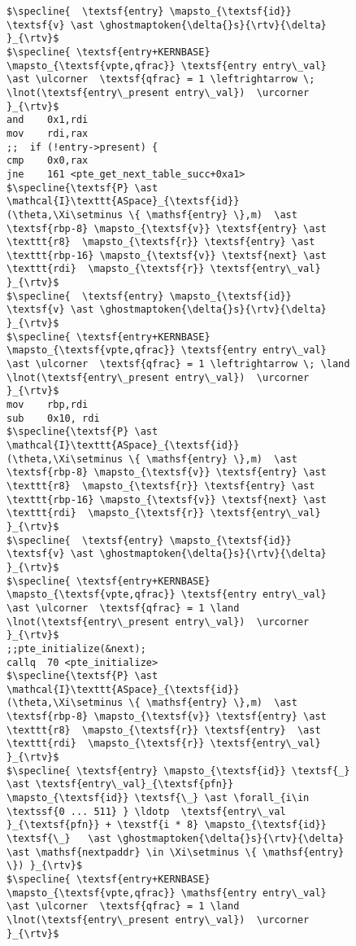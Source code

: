 \begin{figure}
\begin{lstlisting}[mathescape]
$\specline{  \textsf{entry} \mapsto_{\textsf{id}} \textsf{v} \ast \ghostmaptoken{\delta{}s}{\rtv}{\delta}  }_{\rtv}$
$\specline{ \textsf{entry+KERNBASE} \mapsto_{\textsf{vpte,qfrac}} \textsf{entry entry\_val} \ast \ulcorner  \textsf{qfrac} = 1 \leftrightarrow \; \lnot(\textsf{entry\_present entry\_val})  \urcorner }_{\rtv}$
and    0x1,rdi
mov    rdi,rax
;;  if (!entry->present) {
cmp    0x0,rax
jne    161 <pte_get_next_table_succ+0xa1>
$\specline{\textsf{P} \ast \mathcal{I}\texttt{ASpace}_{\textsf{id}}(\theta,\Xi\setminus \{ \mathsf{entry} \},m)  \ast \textsf{rbp-8} \mapsto_{\textsf{v}} \textsf{entry} \ast \texttt{r8}  \mapsto_{\textsf{r}} \textsf{entry} \ast \texttt{rbp-16} \mapsto_{\textsf{v}} \textsf{next} \ast \texttt{rdi}  \mapsto_{\textsf{r}} \textsf{entry\_val} }_{\rtv}$
$\specline{  \textsf{entry} \mapsto_{\textsf{id}} \textsf{v} \ast \ghostmaptoken{\delta{}s}{\rtv}{\delta}  }_{\rtv}$
$\specline{ \textsf{entry+KERNBASE} \mapsto_{\textsf{vpte,qfrac}} \textsf{entry entry\_val} \ast \ulcorner  \textsf{qfrac} = 1 \leftrightarrow \; \land \lnot(\textsf{entry\_present entry\_val})  \urcorner }_{\rtv}$
mov    rbp,rdi
sub    0x10, rdi
$\specline{\textsf{P} \ast \mathcal{I}\texttt{ASpace}_{\textsf{id}}(\theta,\Xi\setminus \{ \mathsf{entry} \},m)  \ast \textsf{rbp-8} \mapsto_{\textsf{v}} \textsf{entry} \ast \texttt{r8}  \mapsto_{\textsf{r}} \textsf{entry} \ast \texttt{rbp-16} \mapsto_{\textsf{v}} \textsf{next} \ast \texttt{rdi}  \mapsto_{\textsf{r}} \textsf{entry\_val}  }_{\rtv}$
$\specline{  \textsf{entry} \mapsto_{\textsf{id}} \textsf{v} \ast \ghostmaptoken{\delta{}s}{\rtv}{\delta} }_{\rtv}$
$\specline{ \textsf{entry+KERNBASE} \mapsto_{\textsf{vpte,qfrac}} \textsf{entry entry\_val} \ast \ulcorner  \textsf{qfrac} = 1 \land \lnot(\textsf{entry\_present entry\_val})  \urcorner }_{\rtv}$
;;pte_initialize(&next);
callq  70 <pte_initialize>
$\specline{\textsf{P} \ast \mathcal{I}\texttt{ASpace}_{\textsf{id}}(\theta,\Xi\setminus \{ \mathsf{entry} \},m)  \ast \textsf{rbp-8} \mapsto_{\textsf{v}} \textsf{entry} \ast \texttt{r8}  \mapsto_{\textsf{r}} \textsf{entry}  \ast \texttt{rdi}  \mapsto_{\textsf{r}} \textsf{entry\_val}  }_{\rtv}$
$\specline{ \textsf{entry} \mapsto_{\textsf{id}} \textsf{_} \ast \textsf{entry\_val}_{\textsf{pfn}} \mapsto_{\textsf{id}} \textsf{\_} \ast \forall_{i\in \textssf{0 ... 511} } \ldotp  \textsf{entry\_val }_{\textsf{pfn}} + \texstf{i * 8} \mapsto_{\textsf{id}} \textsf{\_}   \ast \ghostmaptoken{\delta{}s}{\rtv}{\delta} \ast \mathsf{nextpaddr} \in \Xi\setminus \{ \mathsf{entry} \}) }_{\rtv}$
$\specline{ \textsf{entry+KERNBASE} \mapsto_{\textsf{vpte,qfrac}} \mathsf{entry entry\_val} \ast \ulcorner  \textsf{qfrac} = 1 \land \lnot(\textsf{entry\_present entry\_val})  \urcorner }_{\rtv}$

\end{lstlisting}
\end{figure}
